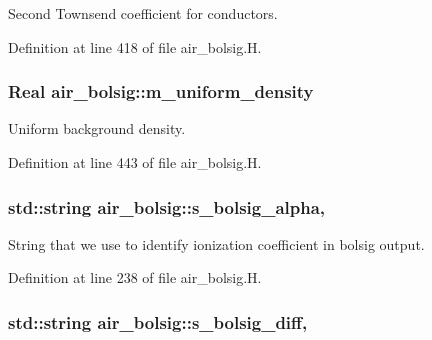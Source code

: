 Second Townsend coefficient for conductors. 



Definition at line 418 of file air\+\_\+bolsig.\+H.

\subsubsection[{\texorpdfstring{m\+\_\+uniform\+\_\+density}{m_uniform_density}}]{\setlength{\rightskip}{0pt plus 5cm}Real air\+\_\+bolsig\+::m\+\_\+uniform\+\_\+density\hspace{0.3cm}{\ttfamily [protected]}}\hypertarget{classair__bolsig_afd1faef720f2f4c07ef7c90467d5f9f7}{}\label{classair__bolsig_afd1faef720f2f4c07ef7c90467d5f9f7}


Uniform background density. 



Definition at line 443 of file air\+\_\+bolsig.\+H.

\subsubsection[{\texorpdfstring{s\+\_\+bolsig\+\_\+alpha}{s_bolsig_alpha}}]{\setlength{\rightskip}{0pt plus 5cm}std\+::string air\+\_\+bolsig\+::s\+\_\+bolsig\+\_\+alpha\hspace{0.3cm}{\ttfamily [static]}, {\ttfamily [protected]}}\hypertarget{classair__bolsig_a27e88db58fa4c4b36fcc6b19b4772243}{}\label{classair__bolsig_a27e88db58fa4c4b36fcc6b19b4772243}


String that we use to identify ionization coefficient in bolsig output. 



Definition at line 238 of file air\+\_\+bolsig.\+H.

\subsubsection[{\texorpdfstring{s\+\_\+bolsig\+\_\+diff}{s_bolsig_diff}}]{\setlength{\rightskip}{0pt plus 5cm}std\+::string air\+\_\+bolsig\+::s\+\_\+bolsig\+\_\+diff\hspace{0.3cm}{\ttfamily [static]}, {\ttfamily [protected]}}\hypertarget{classair__bolsig_a7783435ca318b61965e97cce4750444b}{}\label{classair__bolsig_a7783435ca318b61965e97cce4750444b}


